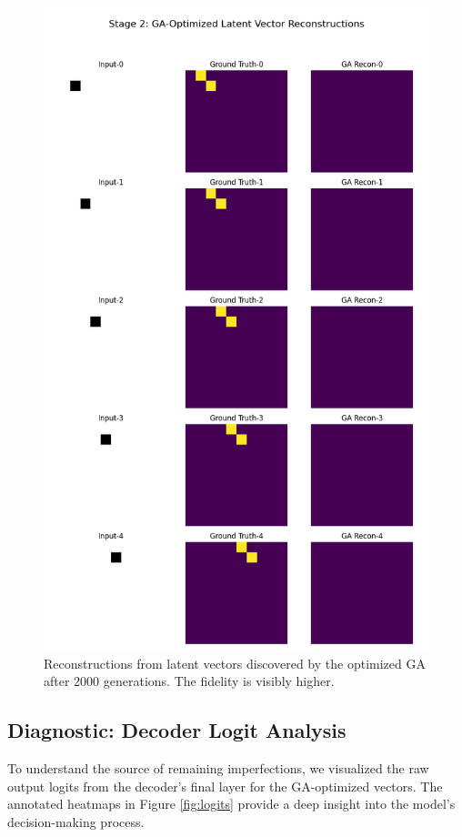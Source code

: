 \documentclass[11pt, a4paper, twocolumn]{article}
\begin{document}
\begin{figure}[H]
    \centering
    \includegraphics[width=\columnwidth]{stage2_ga_predictions.png}
    \caption{Reconstructions from latent vectors discovered by the optimized GA after 2000 generations. The fidelity is visibly higher.}
    \label{fig:stage2}
\end{figure}

\subsection{Diagnostic: Decoder Logit Analysis}
To understand the source of remaining imperfections, we visualized the raw output logits from the decoder's final layer for the GA-optimized vectors. The annotated heatmaps in Figure \ref{fig:logits} provide a deep insight into the model's decision-making process.
\end{document}
